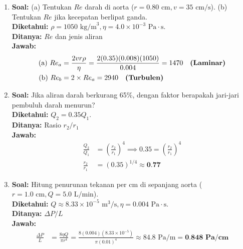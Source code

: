 \documentclass[twocolumn]{article}
\begin{document}
\begin{enumerate}
    \item \textbf{Soal:} (a) Tentukan $Re$ darah di aorta ($r = 0.80 \text{ cm}, v = 35 \text{ cm/s}$). (b) Tentukan $Re$ jika kecepatan berlipat ganda. \\
    \textbf{Diketahui:} $\rho = 1050 \text{ kg/m}^3, \eta = 4.0 \times 10^{-3} \text{ Pa}\cdot\text{s}$. \\
    \textbf{Ditanya:} $Re$ dan jenis aliran \\
    \textbf{Jawab:}
    \begin{align*}
        \text{(a) } Re_a &= \frac{2 v r \rho}{\eta} = \frac{2(0.35)(0.008)(1050)}{0.004} = 1470 \quad \text{\textbf{(Laminar)}} \\
        \text{(b) } Re_b &= 2 \times Re_a = 2940 \quad \text{\textbf{(Turbulen)}}
    \end{align*}

    \item \textbf{Soal:} Jika aliran darah berkurang 65\%, dengan faktor berapakah jari-jari pembuluh darah menurun? \\
    \textbf{Diketahui:} $Q_2 = 0.35 Q_1$. \\
    \textbf{Ditanya:} Rasio $r_2 / r_1$ \\
    \textbf{Jawab:}
    \begin{align*}
        \frac{Q_2}{Q_1} &= \left( \frac{r_2}{r_1} \right)^4 \implies 0.35 = \left( \frac{r_2}{r_1} \right)^4 \\
        \frac{r_2}{r_1} &= (0.35)^{1/4} \approx \textbf{0.77}
    \end{align*}

    \item \textbf{Soal:} Hitung penurunan tekanan per cm di sepanjang aorta ($r = 1.0 \text{ cm}, Q = 5.0 \text{ L/min}$). \\
    \textbf{Diketahui:} $Q \approx 8.33 \times 10^{-5} \text{ m}^3/\text{s}, \eta = 0.004 \text{ Pa}\cdot\text{s}$. \\
    \textbf{Ditanya:} $\Delta P / L$ \\
    \textbf{Jawab:}
    \begin{align*}
        \frac{\Delta P}{L} &= \frac{8 \eta Q}{\pi r^4} = \frac{8(0.004)(8.33 \times 10^{-5})}{\pi (0.01)^4} \approx 84.8 \text{ Pa/m} = \textbf{0.848 Pa/cm}
    \end{align*}


\end{enumerate}
\end{document}

